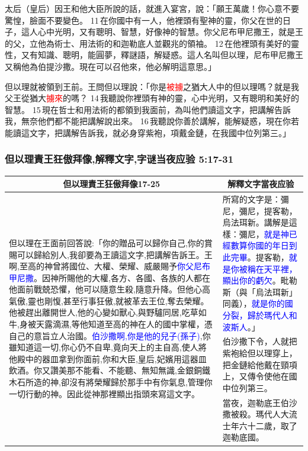太后（皇后）因王和他大臣所說的話，就進入宴宮，說：「願王萬歲！你心意不要驚惶，臉面不要變色。 11 在你國中有一人，他裡頭有聖神的靈，你父在世的日子，這人心中光明，又有聰明、智慧，好像神的智慧。你父尼布甲尼撒王，就是王的父，立他為術士、用法術的和迦勒底人並觀兆的領袖。 12 在他裡頭有美好的靈性，又有知識、聰明，能圓夢，釋謎語，解疑惑。這人名叫但以理，尼布甲尼撒王又稱他為伯提沙撒。現在可以召他來，他必解明這意思。」

但以理就被領到王前。王問但以理說：「你是\textcolor{red}{被擄}之猶大人中的但以理嗎？就是我父王從猶大\textcolor{red}{擄來}的嗎？ 14 我聽說你裡頭有神的靈，心中光明，又有聰明和美好的智慧。 15 現在哲士和用法術的都領到我面前，為叫他們讀這文字，把講解告訴我，無奈他們都不能把講解說出來。 16 我聽說你善於講解，能解疑惑，現在你若能讀這文字，把講解告訴我，就必身穿紫袍，項戴金鏈，在我國中位列第三。」

\subsubsection{但以理責王狂傲拜像,解釋文字,字谜当夜应验 5:17-31}
\begin{table}[H]
\centering
\begin{tabular}{p{11cm}|p{6.50cm}}\hline\hline
\multicolumn{1}{c|}{但以理責王狂傲拜像17-25}&\multicolumn{1}{c}{解釋文字當夜应验}\\\hline
\multirow{3}{11.25cm}{但以理在王面前回答說:「你的贈品可以歸你自己,你的賞賜可以歸給別人,我卻要為王讀這文字,把講解告訴王。王啊,至高的神曾將國位、大權、榮耀、威嚴賜予\textcolor{blue}{你父尼布甲尼撒}。因神所賜他的大權,各方、各國、各族的人都在他面前戰兢恐懼，他可以隨意生殺,隨意升降。但他心高氣傲,靈也剛愎,甚至行事狂傲,就被革去王位,奪去榮耀。他被趕出離開世人,他的心變如獸心,與野驢同居,吃草如牛,身被天露滴濕,等他知道至高的神在人的國中掌權，憑自己的意旨立人治國。\textcolor{blue}{伯沙撒啊,你是他的兒子(孫子)},你雖知道這一切,你心仍不自卑,竟向天上的主自高,使人將他殿中的器皿拿到你面前,你和大臣,皇后,妃嬪用這器皿飲酒。你又讚美那不能看、不能聽、無知無識,金銀銅鐵木石所造的神,卻沒有將榮耀歸於那手中有你氣息,管理你一切行動的神。因此從神那裡顯出指頭來寫這文字。}
&所寫的文字是：彌尼，彌尼，提客勒，烏法珥新。講解是這樣：彌尼，\textcolor{blue}{就是神已經數算你國的年日到此完畢}。提客勒，\textcolor{blue}{就是你被稱在天平裡，顯出你的虧欠}。毗勒斯（與「烏法珥新」同義），\textcolor{blue}{就是你的國分裂，歸於瑪代人和波斯人}。」\\\cline{2-2}
&伯沙撒下令，人就把紫袍給但以理穿上，把金鏈給他戴在頸項上，又傳令使他在國中位列第三。\\\cline{2-2}
&當夜，迦勒底王伯沙撒被殺。瑪代人大流士年六十二歲，取了迦勒底國。\\\hline
\end{tabular}
\end{table}



